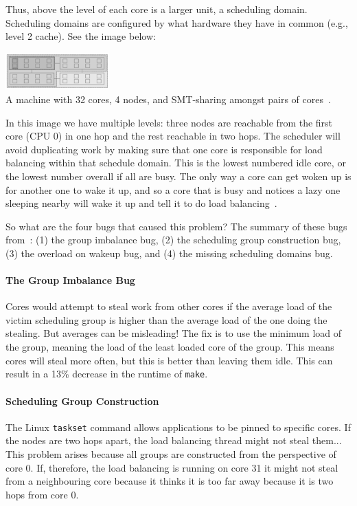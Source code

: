Thus, above the level of each core is a larger unit, a scheduling domain. Scheduling domains are configured by what hardware they have in common (e.g., level 2 cache). See the image below:

\begin{center}
	\includegraphics[width=0.3\textwidth]{images/wastedcores.png}\\
	A machine with 32 cores, 4 nodes, and SMT-sharing amongst pairs of cores~\cite{wastedcores}.
\end{center}

In this image we have multiple levels: three nodes are reachable from the first core (CPU 0) in one hop and the rest reachable in two hops. The scheduler will avoid duplicating work by making sure that one core is responsible for load balancing within that schedule domain. This is the lowest numbered idle core, or the lowest number overall if all are busy. The only way a core can get woken up is for another one to wake it up, and so a core that is busy and notices a lazy one sleeping nearby will wake it up and tell it to do load balancing~\cite{wastedcores2}.

So what are the four bugs that caused this problem? The summary of these bugs from~\cite{wastedcores2}: (1) the group imbalance bug, (2) the scheduling group construction bug, (3) the overload on wakeup bug, and (4) the missing scheduling domains bug.

\paragraph{The Group Imbalance Bug} Cores would attempt to steal work from other cores if the average load of the victim scheduling group is higher than the average load of the one doing the stealing. But averages can be misleading! The fix is to use the minimum load of the group, meaning the load of the least loaded core of the group. This means cores will steal more often, but this is better than leaving them idle. This can result in a 13\% decrease in the runtime of \texttt{make}.

\paragraph{Scheduling Group Construction} The Linux \texttt{taskset} command allows applications to be pinned to specific cores. If the nodes are two hops apart, the load balancing thread might not steal them... This problem arises because all groups are constructed from the perspective of core 0. If, therefore, the load balancing is running on core 31 it might not steal from a neighbouring core because it thinks it is too far away because it is two hops from core 0.

